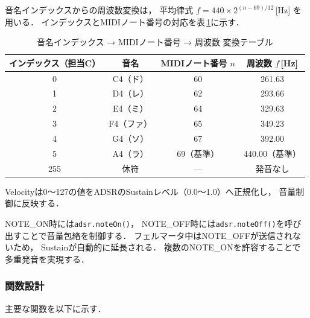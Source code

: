 \documentclass[lualatex,book,paper=a4paper,jafontsize=11.5pt,jafontscale=1.05,oneside]{jlreq}
\begin{document}
音名インデックスからの周波数変換は，
平均律式 $f = 440 \times 2^{(n-69)/12}$\,[Hz] を用いる．
インデックスとMIDIノート番号の対応を表\,\ref{tab:midi_table}に示す．

\begin{table}[H]
  \centering
  \caption{音名インデックス → MIDIノート番号 → 周波数 変換テーブル}
  \label{tab:midi_table}
  \begin{tabular}{cccc}
    \hline
    インデックス（担当C） & 音名 & MIDIノート番号 $n$ & 周波数 $f$\,[Hz] \\
    \hline
    0   & C4（ド） & 60              & 261.63 \\
    1   & D4（レ） & 62              & 293.66 \\
    2   & E4（ミ） & 64              & 329.63 \\
    3   & F4（ファ）& 65             & 349.23 \\
    4   & G4（ソ） & 67              & 392.00 \\
    5   & A4（ラ） & 69（基準）      & 440.00（基準） \\
    \hline
    255 & 休符     & —               & 発音なし \\
    \hline
  \end{tabular}
\end{table}

Velocityは0〜127の値をADSRのSustainレベル（0.0〜1.0）へ正規化し，
音量制御に反映する．

NOTE\_ON時には\texttt{adsr.noteOn()}，
NOTE\_OFF時には\texttt{adsr.noteOff()}を呼び出すことで音量包絡を制御する．
フェルマータ中はNOTE\_OFFが送信されないため，
Sustainが自動的に延長される．
複数のNOTE\_ONを許容することで多重発音を実現する．

\subsubsection{関数設計}

主要な関数を以下に示す．
\end{document}
